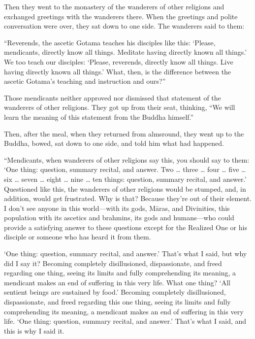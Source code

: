 \documentclass[12pt,openany]{book}%
\begin{document}
Then they went to the monastery of the wanderers of other religions and exchanged greetings with the wanderers there. When the greetings and polite conversation were over, they sat down to one side. The wanderers said to them: 

“Reverends, the ascetic Gotama teaches his disciples like this: ‘Please, mendicants, directly know all things. Meditate having directly known all things.’ We too teach our disciples: ‘Please, reverends, directly know all things. Live having directly known all things.’ What, then, is the difference between the ascetic Gotama’s teaching and instruction and ours?” 

Those mendicants neither approved nor dismissed that statement of the wanderers of other religions. They got up from their seat, thinking, “We will learn the meaning of this statement from the Buddha himself.” 

Then, after the meal, when they returned from almsround, they went up to the Buddha, bowed, sat down to one side, and told him what had happened. 

“Mendicants, when wanderers of other religions say this, you should say to them: ‘One thing: question, summary recital, and answer. Two … three … four … five … six … seven … eight … nine … ten things: question, summary recital, and answer.’ Questioned like this, the wanderers of other religions would be stumped, and, in addition, would get frustrated. Why is that? Because they’re out of their element. I don’t see anyone in this world—with its gods, \textsanskrit{Māras}, and Divinities, this population with its ascetics and brahmins, its gods and humans—who could provide a satisfying answer to these questions except for the Realized One or his disciple or someone who has heard it from them. 

‘One thing: question, summary recital, and answer.’ That’s what I said, but why did I say it? Becoming completely disillusioned, dispassionate, and freed regarding one thing, seeing its limits and fully comprehending its meaning, a mendicant makes an end of suffering in this very life. What one thing? ‘All sentient beings are sustained by food.’ Becoming completely disillusioned, dispassionate, and freed regarding this one thing, seeing its limits and fully comprehending its meaning, a mendicant makes an end of suffering in this very life. ‘One thing: question, summary recital, and answer.’ That’s what I said, and this is why I said it. 
\end{document}
